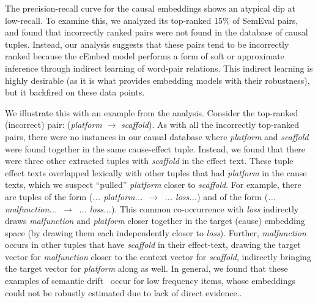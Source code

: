 The precision-recall curve for the causal embeddings shows an atypical dip at low-recall.  To examine this, we analyzed its top-ranked 15\% of SemEval pairs, and found that incorrectly ranked pairs were not found in the database of causal tuples.  
Instead, our analysis suggests that these pairs tend to be incorrectly ranked because the cEmbed model performs a form of soft or approximate inference through indirect learning of word-pair relations.  
This indirect learning is highly desirable (as it is what provides embedding models with their robustness), but it backfired on these data points.  

We illustrate this with an example from the analysis.  Consider the top-ranked (incorrect) pair:  (\emph{platform} $\rightarrow$ \emph{scaffold}).  As with all the incorrectly top-ranked pairs, there were no instances in our causal database where \emph{platform} and \emph{scaffold} were found together in the same cause-effect tuple.  
%
Instead, we found that there were  three other extracted tuples with \emph{scaffold} in the effect text.  
These tuple effect texts overlapped lexically with other tuples that had \textit{platform} in the cause texts, which we suspect ``pulled'' \textit{platform} closer to \textit{scaffold}.
For example, there are tuples of the form (\textit{... platform...}~$\rightarrow$~\textit{... loss...}) and of the form (\textit{... malfunction...}~$\rightarrow$~\textit{... loss...}).    
This common co-occurrence with \textit{loss} indirectly draws \textit{malfunction} and \textit{platform} closer together in the target (cause) embedding space (by drawing them each independently closer to \textit{loss}). 
Further, \textit{malfunction} occurs in other tuples that have \textit{scaffold} in their effect-text, drawing the target vector for \textit{malfunction} closer to the context vector for \textit{scaffold}, indirectly bringing the target vector for \textit{platform} along as well.
In general, we found that these examples of semantic drift~\citep{curran2007minimising} occur for low frequency items, whose embeddings could not be robustly estimated due to lack of direct evidence.. 

